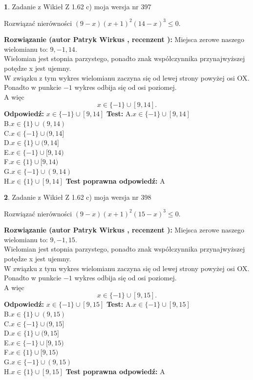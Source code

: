 \documentclass[12pt, a4paper]{article}
\theoremstyle{definition} %
\newtheorem{zad}{}
\newcommand{\zadStart}[1]{\begin{zad}#1\newline}
\newcommand{\zadStop}{\end{zad}}
\newcommand{\rozwStart}[2]{\noindent \textbf{Rozwiązanie (autor #1 , recenzent #2): }\newline}
\newcommand{\rozwStop}{\newline}
\newcommand{\odpStart}{\noindent \textbf{Odpowiedź:}\newline}
\newcommand{\odpStop}{\newline}
\newcommand{\testStart}{\noindent \textbf{Test:}\newline}
\newcommand{\testStop}{\newline}
\newcommand{\kluczStart}{\noindent \textbf{Test poprawna odpowiedź:}\newline}
\newcommand{\kluczStop}{\newline}
\begin{document}
\zadStart{Zadanie z Wikieł Z 1.62 c) moja wersja nr 397}

Rozwiązać nierówności $(9-x)(x+1)^{2}(14-x)^{3}\le0$.
\zadStop
\rozwStart{Patryk Wirkus}{}
Miejsca zerowe naszego wielomianu to: $9, -1, 14$.\\
Wielomian jest stopnia parzystego, ponadto znak współczynnika przy\linebreak najwyższej potędze x jest ujemny.\\ W związku z tym wykres wielomianu zaczyna się od lewej strony powyżej osi OX.\\
Ponadto w punkcie $-1$ wykres odbija się od osi poziomej.\\
A więc $$x \in \{-1\} \cup [9,14].$$
\rozwStop
\odpStart
$x \in \{-1\} \cup [9,14]$
\odpStop
\testStart
A.$x \in \{-1\} \cup [9,14]$\\
B.$x \in \{1\} \cup (9,14)$\\
C.$x \in \{-1\} \cup (9,14]$\\
D.$x \in \{1\} \cup (9,14]$\\
E.$x \in \{-1\} \cup [9,14)$\\
F.$x \in \{1\} \cup [9,14)$\\
G.$x \in \{-1\} \cup (9,14)$\\
H.$x \in \{1\} \cup [9,14]$
\testStop
\kluczStart
A
\kluczStop



\zadStart{Zadanie z Wikieł Z 1.62 c) moja wersja nr 398}

Rozwiązać nierówności $(9-x)(x+1)^{2}(15-x)^{3}\le0$.
\zadStop
\rozwStart{Patryk Wirkus}{}
Miejsca zerowe naszego wielomianu to: $9, -1, 15$.\\
Wielomian jest stopnia parzystego, ponadto znak współczynnika przy\linebreak najwyższej potędze x jest ujemny.\\ W związku z tym wykres wielomianu zaczyna się od lewej strony powyżej osi OX.\\
Ponadto w punkcie $-1$ wykres odbija się od osi poziomej.\\
A więc $$x \in \{-1\} \cup [9,15].$$
\rozwStop
\odpStart
$x \in \{-1\} \cup [9,15]$
\odpStop
\testStart
A.$x \in \{-1\} \cup [9,15]$\\
B.$x \in \{1\} \cup (9,15)$\\
C.$x \in \{-1\} \cup (9,15]$\\
D.$x \in \{1\} \cup (9,15]$\\
E.$x \in \{-1\} \cup [9,15)$\\
F.$x \in \{1\} \cup [9,15)$\\
G.$x \in \{-1\} \cup (9,15)$\\
H.$x \in \{1\} \cup [9,15]$
\testStop
\kluczStart
A
\kluczStop
\end{document}
